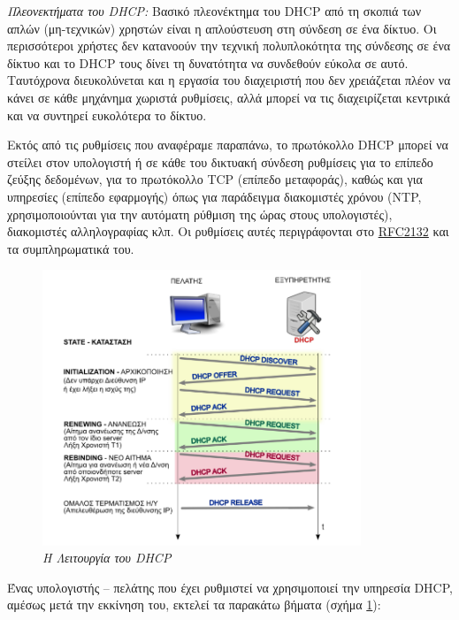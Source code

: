 \emph{Πλεονεκτήματα του DHCP:} Βασικό πλεονέκτημα του DHCP από τη σκοπιά των απλών (μη-τεχνικών) χρηστών είναι η απλούστευση στη σύνδεση σε ένα δίκτυο. Οι περισσότεροι χρήστες δεν κατανοούν την τεχνική πολυπλοκότητα της σύνδεσης σε ένα δίκτυο και το DHCP τους δίνει τη δυνατότητα να συνδεθούν εύκολα σε αυτό. Ταυτόχρονα διευκολύνεται και η εργασία του διαχειριστή που δεν χρειάζεται πλέον να κάνει σε κάθε μηχάνημα χωριστά ρυθμίσεις, αλλά μπορεί να τις διαχειρίζεται κεντρικά και να συντηρεί ευκολότερα το δίκτυο. 

Εκτός από τις ρυθμίσεις που αναφέραμε παραπάνω, το πρωτόκολλο DHCP μπορεί να στείλει στον υπολογιστή ή σε κάθε του δικτυακή σύνδεση ρυθμίσεις για το επίπεδο ζεύξης δεδομένων, για το πρωτόκολλο TCP (επίπεδο μεταφοράς), καθώς και για υπηρεσίες (επίπεδο εφαρμογής) όπως για παράδειγμα διακομιστές χρόνου (NTP, χρησιμοποιούνται για την αυτόματη ρύθμιση της ώρας στους υπολογιστές), διακομιστές αλληλογραφίας κλπ. Οι ρυθμίσεις αυτές περιγράφονται στο \href{https://www.ietf.org/rfc/rfc2132.txt}{RFC2132} και τα συμπληρωματικά του.

\begin{figure}[!ht]
 \centering
 \includegraphics[width=0.85\textwidth]{images/chapter3/3-18}
 \caption {\textsl{Η Λειτουργία του DHCP}}
 \label{3-18}
\end{figure}

Ένας υπολογιστής -- πελάτης που έχει ρυθμιστεί να χρησιμοποιεί την υπηρεσία DHCP, αμέσως μετά την εκκίνηση του, εκτελεί τα παρακάτω βήματα (σχήμα \ref{3-18}):

